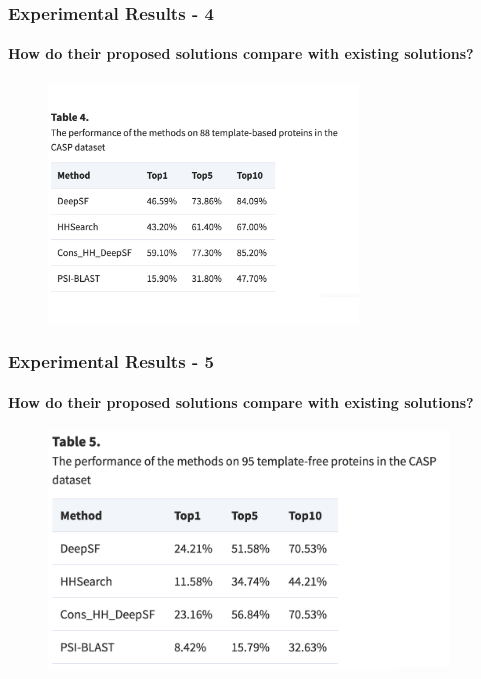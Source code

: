 \documentclass[xcolor={usenames,dvipsnames},hyperref={hyperindex,bookmarks}]{beamer}
\begin{document}
\frame
{
	\frametitle{Experimental Results - 4}
	\framesubtitle{How do their proposed solutions compare with existing solutions?}


	\begin{figure}[h]
	\centering 
	\includegraphics[height=2.5in]{./pics/table-4}
	\label{fig:Table4}
	\end{figure}
}







\frame
{
	\frametitle{Experimental Results - 5}
	\framesubtitle{How do their proposed solutions compare with existing solutions?}


	\begin{figure}[h]
	\centering 
	\includegraphics[height=2.5in]{./pics/table-5}
	\label{fig:Table5}
	\end{figure}
}
\end{document}
